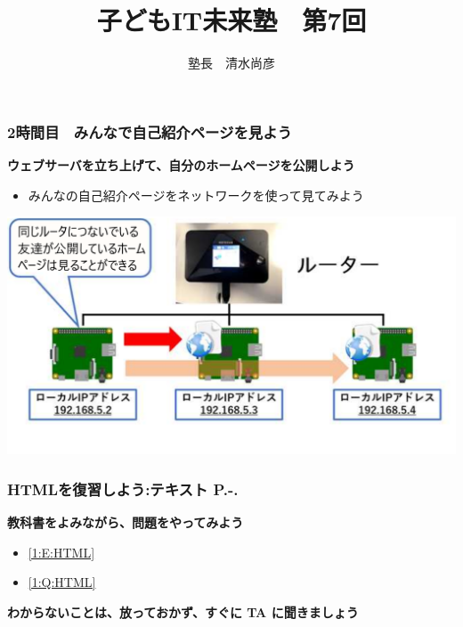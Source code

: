 \documentclass[dvipdfmx]{beamer}
\title{子どもIT未来塾　第7回}
\author{塾長　清水尚彦}
\begin{document}



\begin{frame}[fragile]
	\frametitle{2時間目　みんなで自己紹介ページを見よう ~~~}
    \large\textbf{ウェブサーバを立ち上げて、自分のホームページを公開しよう}
        \begin{itemize}
            \item みんなの自己紹介ページをネットワークを使って見てみよう
        \end{itemize}
        \begin{minipage}{\textwidth}
            {\upshape
              \includegraphics[width=\textwidth]{slide07-img015.png}}
        \end{minipage}
\end{frame}

\begin{frame}[fragile]
	\frametitle{HTMLを復習しよう:テキスト P.\pageref{1:P:HTML}-.\pageref{1:P:HP}~~~}
      \large\textbf{教科書をよみながら、問題をやってみよう}
				\begin{itemize}
					\item \ref*{1:E:HTML}
					\item \ref*{1:Q:HTML} 
				\end{itemize}
      \vfill
      \large\textbf{わからないことは、放っておかず、すぐに TA に聞きましょう}
\end{frame}
\end{document}
